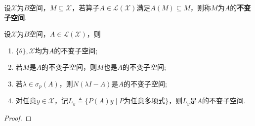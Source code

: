 \documentclass[../../main.tex]{subfiles}%
\begin{document}
\begin{definition}
设$\mathscr{X}$为$B$空间，$M\subseteq\mathscr{X}$，若算子$A\in\mathscr{L}(\mathscr{X})$满足$A(M)\subseteq M$，则称$M$为$A$的\textbf{不变子空间}.
\end{definition}
\begin{proposition}
设$\mathscr{X}$为$B$空间，$A\in\mathscr{L}(\mathscr{X})$，则
\begin{enumerate}[(1)]
\item $\{\theta\},\mathscr{X}$均为$A$的不变子空间;
\item 若$M$是$A$的不变子空间，则$\overline{M}$也是$A$的不变子空间;
\item 若$\lambda\in\sigma_p(A)$，则$N(\lambda I-A)$是$A$的不变子空间;
\item 对任意$y\in\mathscr{X}$，记$L_y\triangleq\{P(A)y\mid P\text{为任意多项式}\}$，则$L_y$是$A$的不变子空间.
\end{enumerate}
\end{proposition}
\begin{proof}
\end{proof}
\end{document}
